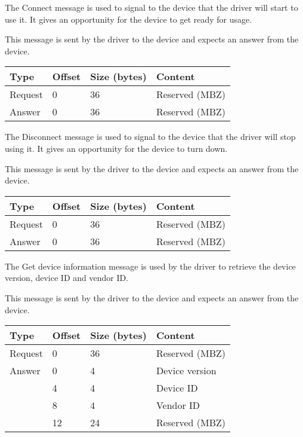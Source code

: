 
The Connect message is used to signal to the device that the driver will start
to use it. It gives an opportunity for the device to get ready for usage.

This message is sent by the driver to the device and expects an answer from the
device.

\begin{tabular}{|l|l|l|l|}
\hline
Type & Offset & Size (bytes) & Content \\
\hline \hline
Request & 0 & 36 & Reserved (MBZ) \\
\hline
Answer & 0 & 36 & Reserved (MBZ) \\
\hline
\end{tabular}


The Disconnect message is used to signal to the device that the driver will
stop using it. It gives an opportunity for the device to turn down.

This message is sent by the driver to the device and expects an answer from the
device.

\begin{tabular}{|l|l|l|l|}
\hline
Type & Offset & Size (bytes) & Content \\
\hline \hline
Request & 0 & 36 & Reserved (MBZ) \\
\hline
Answer & 0 & 36 & Reserved (MBZ) \\
\hline
\end{tabular}


The Get device information message is used by the driver to retrieve the device
version, device ID and vendor ID.

This message is sent by the driver to the device and expects an answer from the
device.

\begin{tabular}{|l|l|l|l|}
\hline
Type & Offset & Size (bytes) & Content \\
\hline \hline
Request & 0 & 36 & Reserved (MBZ) \\
\hline
Answer & 0 & 4 & Device version \\
& 4 & 4 & Device ID \\
& 8 & 4 & Vendor ID \\
& 12 & 24 & Reserved (MBZ) \\
\hline
\end{tabular}


